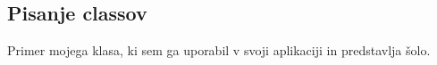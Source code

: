 {\color{indiagreen}\subsection{Pisanje classov}}
Primer mojega klasa, ki sem ga uporabil v svoji aplikaciji in predstavlja šolo.
